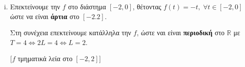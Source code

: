 \documentclass[a4paper,table]{report}
\begin{document}
\begin{solution}
\item {}
  \begin{enumerate}[i)]
    \item 
      Επεκτείνουμε την $f$ στο διάστημα $ [-2,0] $, θέτοντας $ f(t)=-t, \; 
      \forall t \in [-2,0] $ ώστε να είναι \textbf{άρτια} στο $ [-2.2] $.

      Στη συνέχεια επεκτείνουμε κατάλληλα την $f$, ώστε ναι είναι 
      \textbf{περιοδική} στο 
      $ \mathbb{R} $ με $ T=4 \Leftrightarrow 2L=4 \Leftrightarrow \boxed{L=2} $.

      \vspace{\baselineskip}
      \begin{minipage}[t]{0.53\textwidth}
        [$f$ τμηματικά λεία στο $[-2,2]$]
      \end{minipage}


\end{enumerate}
\end{solution}
\end{document}
